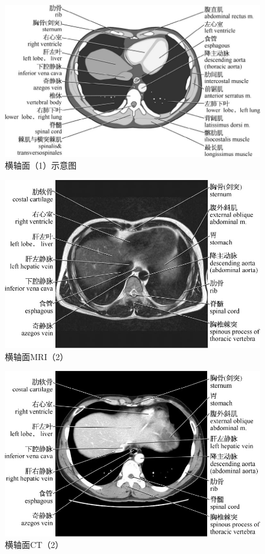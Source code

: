 \begin{figure}[!htbp]
 \centering
 \includegraphics{./images/Image00004.jpg}
 \captionsetup{justification=centering}
 \caption{横轴面（1）示意图}
  \end{figure} 
 \FloatBarrier

\begin{figure}[!htbp]
 \centering
 \includegraphics{./images/Image00005.jpg}
 \captionsetup{justification=centering}
 \caption{横轴面MRI（2）}
  \end{figure} 
 \FloatBarrier

\begin{figure}[!htbp]
 \centering
 \includegraphics{./images/Image00006.jpg}
 \captionsetup{justification=centering}
 \caption{横轴面CT（2）}
  \end{figure} 
 \FloatBarrier

